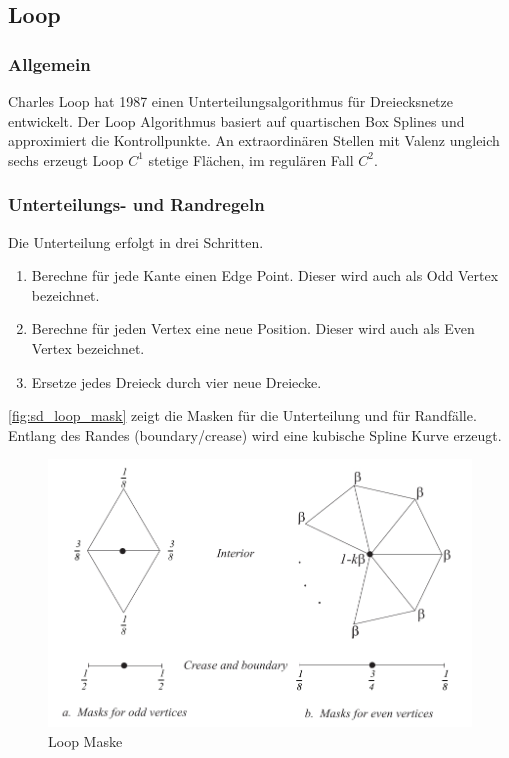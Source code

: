 \subsection{Loop} \label{subsec:loop}

\subsubsection*{Allgemein}

Charles Loop hat 1987 einen Unterteilungsalgorithmus für Dreiecksnetze entwickelt.
Der Loop Algorithmus basiert auf quartischen Box Splines und approximiert die Kontrollpunkte.
An extraordinären Stellen mit Valenz ungleich sechs erzeugt Loop \(C^1\) stetige Flächen,
im regulären Fall \(C^2\).
\cite[S. 70 f.]{Zorin.subdivcourse} \cite[S. 56 f.]{Standford.24.07.2015}

\subsubsection*{Unterteilungs- und Randregeln}

Die Unterteilung erfolgt in drei Schritten.
\begin{enumerate}
\item Berechne für jede Kante einen Edge Point. Dieser wird auch als Odd Vertex bezeichnet.
\item Berechne für jeden Vertex eine neue Position. Dieser wird auch als Even Vertex bezeichnet.
\item Ersetze jedes Dreieck durch vier neue Dreiecke.
\end{enumerate}

\autoref{fig:sd_loop_mask} zeigt die Masken für die Unterteilung
und für Randfälle.
Entlang des Randes (boundary/crease) wird eine kubische Spline Kurve erzeugt.
\cite[S. 70]{Zorin.subdivcourse}
\begin{figure}
\centering
\includegraphics[width=1.0\textwidth]{content/media/sd_loop_mask.jpg}
\caption{Loop Maske \cite[S. 70 f.]{Zorin.subdivcourse}}
\label{fig:sd_loop_mask}
\end{figure}

